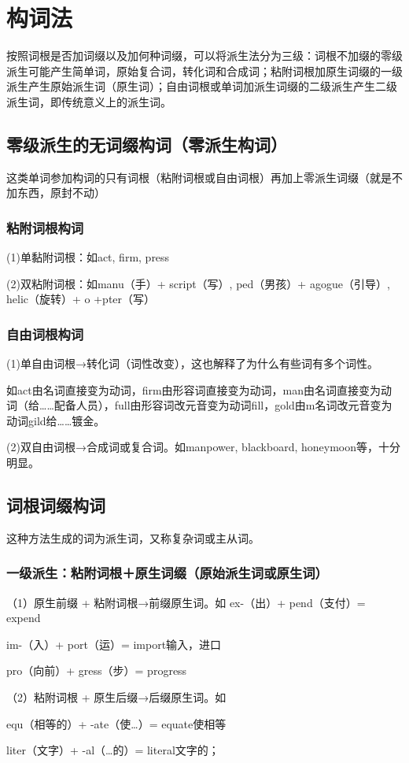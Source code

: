 \chapter{构词法}
按照词根是否加词缀以及加何种词缀，可以将派生法分为三级：词根不加缀的零级派生可能产生简单词，原始复合词，转化词和合成词；粘附词根加原生词缀的一级派生产生原始派生词（原生词）；自由词根或单词加派生词缀的二级派生产生二级派生词，即传统意义上的派生词。
\section{零级派生的无词缀构词（零派生构词）}
这类单词参加构词的只有词根（粘附词根或自由词根）再加上零派生词缀（就是不加东西，原封不动）
\subsection{粘附词根构词}
(1)单黏附词根：如act, firm, press

(2)双粘附词根：如manu（手）+ script（写）, ped（男孩）+ agogue（引导）, helic（旋转）+ o +pter（写）
\subsection{自由词根构词}
(1)单自由词根→转化词（词性改变），这也解释了为什么有些词有多个词性。

如act由名词直接变为动词，firm由形容词直接变为动词，man由名词直接变为动词（给……配备人员），full由形容词改元音变为动词fill，gold由m名词改元音变为动词gild给……镀金。

(2)双自由词根→合成词或复合词。如manpower, blackboard, honeymoon等，十分明显。
\section{词根词缀构词}
这种方法生成的词为派生词，又称复杂词或主从词。
\subsection{一级派生：粘附词根＋原生词缀（原始派生词或原生词）}
（1）原生前缀 + 粘附词根→前缀原生词。如
ex-（出）+ pend（支付）= expend

im-（入）+ port（运）= import输入，进口

pro（向前）+ gress（步）= progress

（2）粘附词根 + 原生后缀→后缀原生词。如

equ（相等的）+ -ate（使…）= equate使相等

liter（文字）+ -al（…的）= literal文字的；

